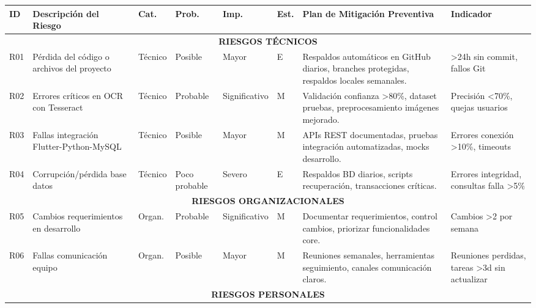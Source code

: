 \begin{table}[H]
\centering
\scriptsize
\renewcommand{\arraystretch}{1.1}
\begin{tabular}{|p{0.6cm}|p{2.8cm}|p{1cm}|p{1cm}|p{1cm}|p{0.6cm}|p{3.5cm}|p{1.8cm}|}
\hline
\textbf{ID} & \textbf{Descripción del Riesgo} & \textbf{Cat.} & \textbf{Prob.} & \textbf{Imp.} & \textbf{Est.} & \textbf{Plan de Mitigación Preventiva} & \textbf{Indicador} \\
\hline

\multicolumn{8}{|c|}{\textbf{RIESGOS TÉCNICOS}} \\
\hline

R01 & Pérdida del código o archivos del proyecto & Técnico & Posible & Mayor & E & Respaldos automáticos en GitHub diarios, branches protegidas, respaldos locales semanales. & >24h sin commit, fallos Git \\
\hline

R02 & Errores críticos en OCR con Tesseract & Técnico & Probable & Significativo & M & Validación confianza >80\%, dataset pruebas, preprocesamiento imágenes mejorado. & Precisión <70\%, quejas usuarios \\
\hline

R03 & Fallas integración Flutter-Python-MySQL & Técnico & Posible & Mayor & M & APIs REST documentadas, pruebas integración automatizadas, mocks desarrollo. & Errores conexión >10\%, timeouts \\
\hline

R04 & Corrupción/pérdida base datos & Técnico & Poco probable & Severo & E & Respaldos BD diarios, scripts recuperación, transacciones críticas. & Errores integridad, consultas falla >5\% \\
\hline

\multicolumn{8}{|c|}{\textbf{RIESGOS ORGANIZACIONALES}} \\
\hline

R05 & Cambios requerimientos en desarrollo & Organ. & Probable & Significativo & M & Documentar requerimientos, control cambios, priorizar funcionalidades core. & Cambios >2 por semana \\
\hline

R06 & Fallas comunicación equipo & Organ. & Posible & Mayor & M & Reuniones semanales, herramientas seguimiento, canales comunicación claros. & Reuniones perdidas, tareas >3d sin actualizar \\
\hline

\multicolumn{8}{|c|}{\textbf{RIESGOS PERSONALES}} \\
\hline


\end{tabular}
\end{table}
